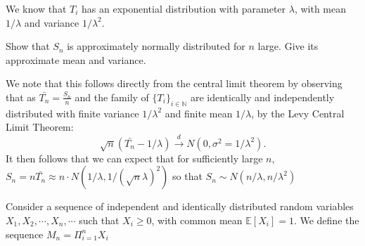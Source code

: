 \documentclass[12pt,twoside, letter]{exam}
\theoremstyle{definition}
\newcommand{\nn}{\mathbb{N}}
\newcommand{\ee}{\mathbb{E}}
\begin{document}
We know that $T_i$ has an exponential distribution with parameter $\lambda$, with mean $1/\lambda$ and variance $1/\lambda^2$.
\par{Show that $S_n$ is approximately normally distributed for $n$ large. Give its approximate mean and variance. }

\begin{solution}
  We note that this follows directly from the central limit theorem by observing that as $\bar{T_n} = \frac{S_n}{n}$ and the family of $\{T_{i}\}_{i \in \nn}$
  are identically and independently distributed with finite variance $1/\lambda^2$ and finite mean $1/\lambda$, by the Levy Central Limit Theorem:
    \begin{equation*}
      \sqrt{n}(\bar{T_n} - 1/\lambda) \overset{d}{\rightarrow} N(0, \sigma^2 = 1/\lambda^2).
    \end{equation*}
  It then follows that we can expect that for sufficiently large $n$, \\
  $S_{n} = n\bar{T_{n}} \approx n \cdot N(1/\lambda, 1/(\sqrt{n}\lambda)^2)$ so that $S_{n} \sim N(n/\lambda, n/\lambda^2)$
\end{solution}

\par{Consider a sequence of independent and identically distributed random variables $X_1, X_2, \cdots, X_n, \cdots$ such that $X_i \geq 0$, with
common mean $\ee[X_{i}] = 1$. We define the sequence $M_n = \Pi^{n}_{i=1} X_i$}
\end{document}
